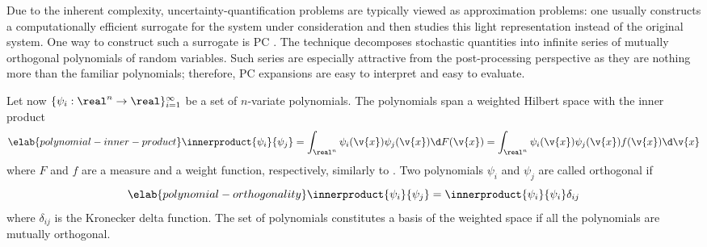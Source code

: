 Due to the inherent complexity, uncertainty-quantification problems are
typically viewed as approximation problems: one usually constructs a
computationally efficient surrogate for the system under consideration and then
studies this light representation instead of the original system. One way to
construct such a surrogate is \acf{PC} \cite{xiu2010}. The technique decomposes
stochastic quantities into infinite series of mutually orthogonal polynomials of
random variables. Such series are especially attractive from the post-processing
perspective as they are nothing more than the familiar polynomials; therefore,
\ac{PC} expansions are easy to interpret and easy to evaluate.

Let now $\{ \psi_i: \real^n \to \real \}_{i = 1}^\infty$ be a set of $n$-variate
polynomials. The polynomials span a weighted Hilbert space with the inner
product
\begin{equation} \elab{polynomial-inner-product}
  \innerproduct{\psi_i}{\psi_j}
  = \int_{\real^n} \psi_i(\v{x}) \psi_j(\v{x}) \d F(\v{x})
  = \int_{\real^n} \psi_i(\v{x}) \psi_j(\v{x}) f(\v{x}) \d \v{x}
\end{equation}
where $F$ and $f$ are a measure and a weight function, respectively, similarly
to . Two polynomials $\psi_i$ and $\psi_j$ are
called orthogonal if
\begin{equation} \elab{polynomial-orthogonality}
  \innerproduct{\psi_i}{\psi_j} = \innerproduct{\psi_i}{\psi_i} \delta_{ij}
\end{equation}
where $\delta_{ij}$ is the Kronecker delta function. The set of polynomials
constitutes a basis of the weighted space if all the polynomials are mutually
orthogonal.

